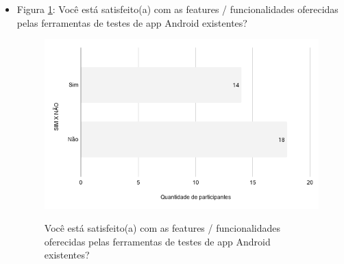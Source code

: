 \begin{itemize}
    
    \item Figura \ref{figure:s_featuresexistentes}: Você está satisfeito(a) com as features  / funcionalidades oferecidas pelas ferramentas de testes de app Android existentes?
        \begin{figure}[!htb]
        \centering
        \includegraphics[width=.80\textwidth]{images/s_featuresexistentes.png}
        \label{figure:s_featuresexistentes}
        \caption{Você está satisfeito(a) com as features  / funcionalidades oferecidas pelas ferramentas de testes de app Android existentes?}
        \end{figure}


    
    
\end{itemize}
















